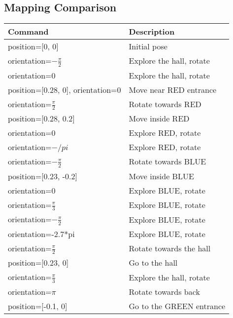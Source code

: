 \begin{appendices}

\chapter{Mapping Comparison}
\label{chap:appendix:mapping_comparison}

\begin{table}[H]
    \centering
    \begin{tabular}{|l|l|}
    \hline
    \textbf{Command} & \textbf{Description} \\
    \hline
    position=[0, 0] & Initial pose \\
    \hline
    orientation=$-\frac{\pi}{2}$ & Explore the hall, rotate \\
    \hline
    orientation=0 & Explore the hall, rotate \\
    \hline
    position=[0.28, 0], orientation=0 & Move near RED entrance \\
    \hline
    orientation=$\frac{\pi}{2}$ & Rotate towards RED \\
    \hline
    position=[0.28, 0.2] & Move inside RED \\
    \hline
    orientation=0 & Explore RED, rotate \\
    \hline
    orientation=$-/pi$ & Explore RED, rotate \\
    \hline
    orientation=$-\frac{\pi}{2}$ & Rotate towards BLUE \\
    \hline
    position=[0.23, -0.2] & Move inside BLUE \\
    \hline
    orientation=0 & Explore BLUE, rotate \\
    \hline
    orientation=$\frac{\pi}{3}$ & Explore BLUE, rotate \\
    \hline
    orientation=$-\frac{\pi}{2}$ & Explore BLUE, rotate \\
    \hline
    orientation=-2.7*pi & Explore BLUE, rotate \\
    \hline
    orientation=$\frac{\pi}{2}$ & Rotate towards the hall \\
    \hline
    position=[0.23, 0] & Go to the hall \\
    \hline
    orientation=$\frac{\pi}{3}$ & Explore the hall, rotate \\
    \hline
    orientation=$\pi$ & Rotate towards back \\
    \hline
    position=[-0.1, 0] & Go to the GREEN entrance \\

\end{tabular}
\end{table}
\end{appendices}
